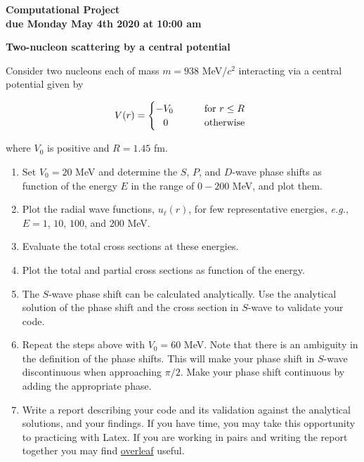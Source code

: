 \documentclass[11pt]{article}
\begin{document}
\begin{center}
{\large{
{\bf 
Computational Project \\
due Monday May 4th 2020 at 10:00 am
}
}
}
\end{center}


\hrulefill
\medskip

\begin{center}
 {\bf Two-nucleon scattering by a central potential }
\end{center}

Consider two nucleons each of mass $m=938$ MeV/$c^2$
interacting via a central potential given by

$$
V(r) = 
\begin{cases}
              -V_0\, \quad\quad           & \text{for }                r \leq R \,  \\
{\color{white}-}0 \, \quad\quad           & \text{otherwise }\,  \\
\end{cases}
$$

\noindent
where $V_0$ is positive and $R=1.45$ fm. 

\begin{enumerate}
 \item Set $V_0=20$ MeV and determine the $S$, $P$, and $D$-wave phase shifts 
 as function of the energy $E$ in the range of $0-200$ MeV, and plot them. 
 \item Plot the radial wave functions, $u_\ell(r)$, for few representative 
 energies, {\it e.g.}, $E=1$, $10$, $100$, and $200$ MeV.
 \item Evaluate the total cross sections at these energies. 
 \item Plot the total and partial cross sections as function of the energy. 
  \item The $S$-wave phase shift can be calculated analytically. Use the analytical 
 solution of the phase shift and the cross section in $S$-wave to validate your code.
 \item Repeat the steps above with $V_0=60$ MeV. Note that there is an ambiguity
 in the definition of the phase shifts. This will make your phase shift in $S$-wave
 discontinuous when approaching $\pi/2$. Make your phase shift continuous by adding
 the appropriate phase. 
 \item Write a report describing your code and its validation against the analytical
 solutions, and your findings. If you have time, you may take this opportunity to 
 practicing with Latex. If you are working in pairs and writing the report together 
 you may find \href{https://www.overleaf.com/}{overleaf} useful. 
\end{enumerate}
\end{document}
